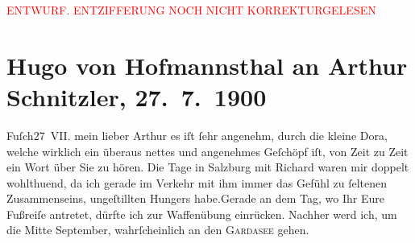 
\begin{center}
            \textcolor{red}{ENTWURF. ENTZIFFERUNG NOCH NICHT KORREKTURGELESEN}
                      \end{center}
            
               \section[Hugo von Hofmannsthal an Arthur Schnitzler, 27. 7. 1900]{ Hugo von Hofmannsthal an Arthur Schnitzler, 27. 7. 1900}\nopagebreak{}\rehead{ }\begin{ledgroupsized}[t]{13cm}\normalsize\beginnumbering{} \toendnotes[C]{\smallbreak\pagebreak[2]} 
\toendnotes[C]{\smallbreak}\pstart
           \raggedleft{}{\pb}Fuſch27 VII.\pend
           \pstart{}mein lieber Arthur \pend\pstart
           es iſt ſehr angenehm, durch die kleine Dora,
               welche wirklich ein überaus nettes und angenehmes Geſchöpf iſt, von Zeit zu Zeit ein
               Wort über Sie zu hören.\pend
           \pstart
           Die Tage in Salzburg mit Richard waren mir doppelt wohlthuend, da ich gerade im Verkehr
               mit ihm immer das Gefühl zu ſeltenen Zusammenseins, ungeſtillten {\pb}Hungers habe.\hspace*{1.5em}Gerade an dem Tag, wo Ihr Eure Fußreiſe antretet, dürfte ich zur
               Waffenübung einrücken. Nachher werd ich, um die Mitte September,
               wahrſcheinlich an den \textsc{Gardasee} gehen.\pend

\end{ledgroupsized}
